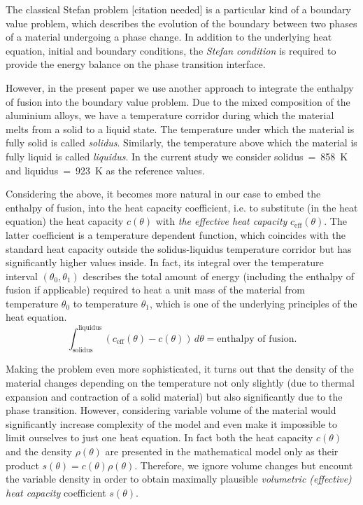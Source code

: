 The classical Stefan problem [citation needed] is a particular kind of a boundary value problem, which describes the evolution of the boundary between two phases of a material undergoing a phase change. In addition to the underlying heat equation, initial and boundary conditions, the \emph{Stefan condition} is required to provide the energy balance on the phase transition interface.

However, in the present paper we use another approach to integrate the enthalpy of fusion into the boundary value problem. Due to the mixed composition of the aluminium alloys, we have a temperature corridor during which the material melts from a solid to a liquid state. The temperature under which the material is fully solid is called \emph{solidus}. Similarly, the temperature above which the material is fully liquid is called \emph{liquidus}. In the current study we consider solidus~=~\SI{858}{\K} and liquidus~=~\SI{923}{K} as the reference values.

Considering the above, it becomes more natural in our case to embed the enthalpy of fusion, into the heat capacity coefficient, i.e. to substitute (in the heat equation) the heat capacity $c(\theta)$ with \emph{the effective heat capacity} $c_{\text{eff}}(\theta)$. The latter coefficient is a temperature dependent function, which coincides with the standard heat capacity outside the solidus-liquidus temperature corridor but has significantly higher values inside. In fact, its integral over the temperature interval $(\theta_0, \theta_1)$ describes the total amount of energy (including the enthalpy of fusion if applicable) required to heat a unit mass of the material from temperature $\theta_0$ to temperature $\theta_1$, which is one of the underlying principles of the heat equation.
\begin{equation}
	\int_\text{solidus}^\text{liquidus} (c_\text{eff}(\theta) - c(\theta))\, d\theta = \text{enthalpy of fusion}. 
\end{equation}

Making the problem even more sophisticated, it turns out that the density of the material changes depending on the temperature not only slightly (due to thermal expansion and contraction of a solid material) but also significantly due to the phase transition. However, considering variable volume of the material would significantly increase complexity of the model and even make it impossible to limit ourselves to just one heat equation. In fact both the heat capacity $c(\theta)$ and the density $\rho(\theta)$ are presented in the mathematical model only as their product $s(\theta) = c(\theta) \rho(\theta)$. Therefore, we ignore volume changes but encount the variable density in order to obtain maximally plausible \emph{volumetric (effective) heat capacity} coefficient $s(\theta)$.

